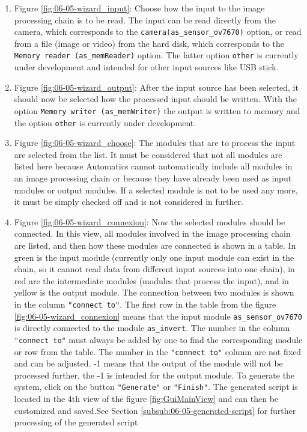 	\begin{enumerate}
		\item Figure \ref{fig:06-05-wizard_input}: Choose how the input to the image processing chain is to be read. The input can be read directly from the camera, which corresponds to the \texttt{camera(as\_sensor\_ov7670)} option, or read from a file (image or video) from the hard disk, which corresponds to the \texttt{Memory reader (as\_memReader)} option. The latter option \texttt{other} is currently under development and intended for other input sources like USB stick.
		
		\item Figure \ref{fig:06-05-wizard_output}: After the input source has been selected, it should now be selected how the processed input should be written. With the option \texttt{Memory writer (as\_memWriter)} the output is written to memory and the option \texttt{other} is currently under development.
		
		\item Figure \ref{fig:06-05-wizard_choose}: The modules that are to process the input are selected from the list. It must be considered that not all \asterics modules are listed here because Automatics cannot automatically include all modules in an image processing chain or because they have already been used as input modules or output modules. If a selected module is not to be used any more, it must be simply checked off and is not considered in further.
		
		\item Figure \ref{fig:06-05-wizard_connexion}: Now the selected \asterics modules should be connected. In this view, all modules involved in the image processing chain are listed, and then how these modules are connected is shown in a table. In green is the input module (currently only one input module can exist in the chain, so it cannot read data from different input sources into one chain), in red are the intermediate modules (modules that process the input), and in yellow is the output module. The connection between two modules is shown in the column \texttt{"connect to"}. The first row in the table from the figure \ref{fig:06-05-wizard_connexion} means that the input module \texttt{as\_sensor\_ov7670} is directly connected to the module \texttt{as\_invert}. The number in the column  \texttt{"connect to"} must always be added by one to find the corresponding module or row from the table. The number in the \texttt{"connect to"} column are not fixed and can be adjusted. -1 means that the output of the module will not be processed further, the -1 is intended for the output module.  To generate the system, click on the button \texttt{"Generate"} or \texttt{"Finish"}. The generated script is located in the 4th view of the figure \ref{fig:GuiMainView} and can then be customized and saved.See Section \ref{subsub:06-05-generated-script} for further processing of the generated script 
	\end{enumerate}
